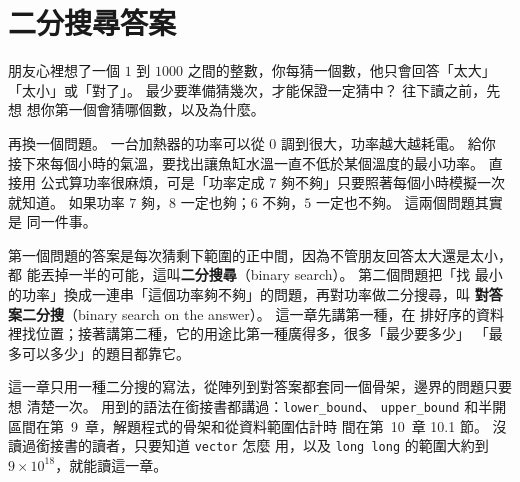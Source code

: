 \chapter{二分搜尋答案}
\label{ch:binary-search}

\newcommand{\bsarrayrow}[5]{%
    \node[left, font=\small] at (-0.6,#1) {#5};
    \foreach \bsv [count=\bsi from 0] in {4,9,15,15,22,31,40,58} {
        \ifnum\bsi=#4
            \node[hlcell] at (\bsi*0.95,#1) {\bsv};
        \else\ifnum\bsi>#2 \ifnum\bsi<#3
            \node[cell] at (\bsi*0.95,#1) {\bsv};
        \else
            \node[cell, fill=coreFill] at (\bsi*0.95,#1) {\bsv};
        \fi\else
            \node[cell, fill=black!12] at (\bsi*0.95,#1) {\bsv};
        \fi\fi
    }%
}
\newcommand{\bscellT}[3]{\node[cell, fill=coreFill, minimum width=0.62cm] at ({#1},{#2}) {#3};}
\newcommand{\bscellF}[3]{\node[cell, fill=black!12, minimum width=0.62cm] at ({#1},{#2}) {#3};}

朋友心裡想了一個 $1$ 到 $1000$ 之間的整數，你每猜一個數，他只會回答「太大」
「太小」或「對了」。 最少要準備猜幾次，才能保證一定猜中？ 往下讀之前，先想
想你第一個會猜哪個數，以及為什麼。

再換一個問題。 一台加熱器的功率可以從 $0$ 調到很大，功率越大越耗電。 給你
接下來每個小時的氣溫，要找出讓魚缸水溫一直不低於某個溫度的最小功率。 直接用
公式算功率很麻煩，可是「功率定成 $7$ 夠不夠」只要照著每個小時模擬一次就知道。
如果功率 $7$ 夠，$8$ 一定也夠；$6$ 不夠，$5$ 一定也不夠。 這兩個問題其實是
同一件事。

第一個問題的答案是每次猜剩下範圍的正中間，因為不管朋友回答太大還是太小，都
能丟掉一半的可能，這叫\textbf{二分搜尋}（binary search）。 第二個問題把「找
最小的功率」換成一連串「這個功率夠不夠」的問題，再對功率做二分搜尋，叫
\textbf{對答案二分搜}（binary search on the answer）。 這一章先講第一種，在
排好序的資料裡找位置；接著講第二種，它的用途比第一種廣得多，很多「最少要多少」
「最多可以多少」的題目都靠它。

這一章只用一種二分搜的寫法，從陣列到對答案都套同一個骨架，邊界的問題只要想
清楚一次。 用到的語法在銜接書都講過：\texttt{lower\_bound}、
\texttt{upper\_bound} 和半開區間在第~9~章，解題程式的骨架和從資料範圍估計時
間在第~10~章 10.1 節。 沒讀過銜接書的讀者，只要知道 \texttt{vector} 怎麼
用，以及 \texttt{long long} 的範圍大約到 $9 \times 10^{18}$，就能讀這一章。

